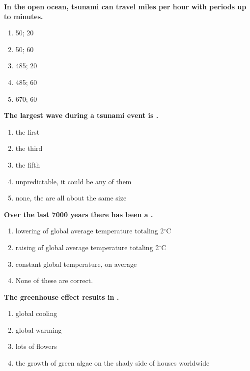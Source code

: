 \item {
\setlength{\itemsep}{0cm}
\setlength{\parskip}{.2cm}
\begin{samepage}
\textbf{
In the open ocean, tsunami can travel \makebox[1cm]{\Rivpt\hrulefill\Rivpt} miles per hour with periods up to \makebox[1cm]{\Rivpt\hrulefill\Rivpt} minutes.
}
\begin{enumerate}
\item { 	50; 20 }
\item { 	50; 60 }
\item { 	485; 20 }
\item { 	485; 60 }
\item { 	670; 60 		 }
\end{enumerate}
\end{samepage}
}
\item {
\setlength{\itemsep}{0cm}
\setlength{\parskip}{.2cm}
\begin{samepage}
\textbf{
The largest wave during a tsunami event is \makebox[1cm]{\Rivpt\hrulefill\Rivpt}.
}
\begin{enumerate}
\item { 	the first }
\item { 	the third }
\item { 	the fifth }
\item { 	unpredictable, it could be any of them }
\item { 	none, the are all about the same size 		 }
\end{enumerate}
\end{samepage}
}
\item {
\setlength{\itemsep}{0cm}
\setlength{\parskip}{.2cm}
\begin{samepage}
\textbf{
Over the last 7000 years there has been a \makebox[1cm]{\Rivpt\hrulefill\Rivpt}.
}
\begin{enumerate}
\item {  lowering of global average temperature totaling 2\ensuremath{^\circ}C }
\item {  raising of global average temperature totaling 2\ensuremath{^\circ}C }
\item {  constant global temperature, on average  }
\item {  None of these are correct. }
\end{enumerate}
\end{samepage}
}
\item {
\setlength{\itemsep}{0cm}
\setlength{\parskip}{.2cm}
\begin{samepage}
\textbf{
The greenhouse effect results in \makebox[1cm]{\Rivpt\hrulefill\Rivpt}.
}
\begin{enumerate}
\item {  global cooling }
\item {  global warming }
\item {  lots of flowers }
\item {  the growth of green algae on the shady side of houses worldwide }
\end{enumerate}
\end{samepage}
}
